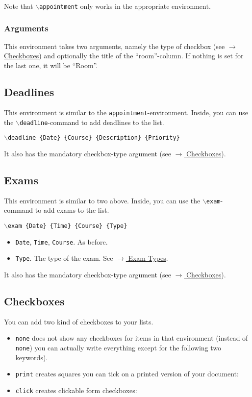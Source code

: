 \documentclass[english]{article}
\newcommand{\cmd}[1]{$\backslash$\texttt{{#1}}}
\begin{document}
	
	Note that \cmd{appointment} only works in the appropriate environment.
	
	\subsubsection{Arguments}
	This environment takes two arguments, namely the type of checkbox (see \hyperref[checkboxes]{$\rightarrow$ Checkboxes}) and optionally the title of the \enquote{room}-column. If nothing is set for the last one, it will be \enquote{Room}.

	\subsection{Deadlines}
	\label{deadlines}
	This environment is similar to the \texttt{appointment}-environment. Inside, you can use the \cmd{deadline}-command to add deadlines to the list.
	\begin{center}
		\cmd{deadline \{Date\} \{Course\} \{Description\} \{Priority\}}
	\end{center}
	It also has the mandatory checkbox-type argument (see \hyperref[checkboxes]{$\rightarrow$ Checkboxes}).


	\subsection{Exams}
	\label{Exams}
	This environment is similar to two above. Inside, you can use the \cmd{exam}-command to add exams to the list.
	\begin{center}
		\cmd{exam \{Date\} \{Time\} \{Course\} \{Type\}}
	\end{center}
	\begin{itemize}
		\item \texttt{Date}, \texttt{Time}, \texttt{Course}.
		As before.
		
		\item \texttt{Type}.
		The type of the exam. See \hyperref[examtypes]{$\rightarrow$ Exam Types}.
	\end{itemize}
	It also has the mandatory checkbox-type argument (see \hyperref[checkboxes]{$\rightarrow$ Checkboxes}).

	\subsection{Checkboxes}
	\label{checkboxes}
	You can add two kind of checkboxes to your lists. 
	\begin{itemize}
		\item 
		\texttt{none} does not show any checkboxes for items in that environment (instead of \texttt{none}) you can actually write everything except for the following two keywords).
		
		\item
		\texttt{print} creates squares you can tick on a printed version of your document: \checkbox{\printcheckboxcmd}
		
		\item
		\texttt{click} creates clickable form checkboxes: \checkbox{\clickcheckboxcmd}
		
		
	\end{itemize}
\end{document}
